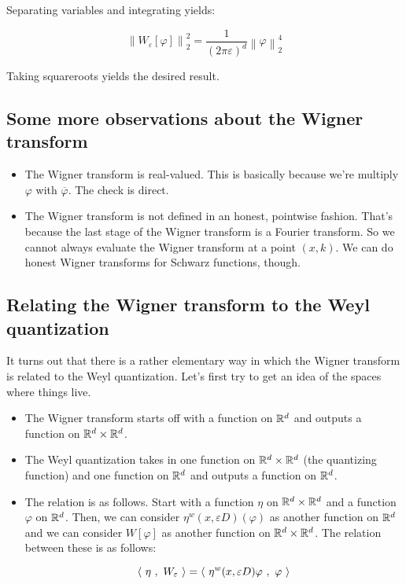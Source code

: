 \documentclass[a4paper]{amsart}
\newcommand{\norm}[1]{\left\|#1\right\|}
\begin{document}
Separating variables and integrating yields:

$$\norm{W_\varepsilon[\varphi]}_2^2 = \frac{1}{(2 \pi \varepsilon)^d} \norm{\varphi}_2^4$$

Taking squareroots yields the desired result.

\subsection{Some more observations about the Wigner transform}

\begin{itemize}

\item The Wigner transform is real-valued. This is basically because
  we're multiply $\varphi$ with $\overline{\varphi}$. The check is direct.

\item The Wigner transform is not defined in an honest, pointwise
  fashion. That's because the last stage of the Wigner transform is a
  Fourier transform. So we cannot always evaluate the Wigner transform
  at a point $(x,k)$. We can do honest Wigner transforms for Schwarz
  functions, though.

\end{itemize}

\subsection{Relating the Wigner transform to the Weyl quantization}

It turns out that there is a rather elementary way in which the Wigner
transform is related to the Weyl quantization. Let's first try to get
an idea of the spaces where things live.

\begin{itemize}

\item The Wigner transform starts off with a function on $\mathbb{R}^d$ and
  outputs a function on $\mathbb{R}^d \times \mathbb{R}^d$.

\item The Weyl quantization takes in one function on $\mathbb{R}^d \times
  \mathbb{R}^d$ (the quantizing function) and one function on $\mathbb{R}^d$ and
  outputs a function on $\mathbb{R}^d$.

\item The relation is as follows. Start with a function $\eta$ on
  $\mathbb{R}^d \times \mathbb{R}^d$ and a function $\varphi$ on $\mathbb{R}^d$. Then, we can
  consider $\eta^w(x,\varepsilon D)(\varphi)$ as another function on
  $\mathbb{R}^d$ and we can consider $W[\varphi]$ as another function on $\mathbb{R}^d
  \times \mathbb{R}^d$. The relation between these is as follows:

  $$\left< \ \eta \ , \ W_\varepsilon \ \right> = \left< \ \eta^w(x,\varepsilon D)\varphi \ , \ \varphi \ \right>$$

\end{itemize}
\end{document}
